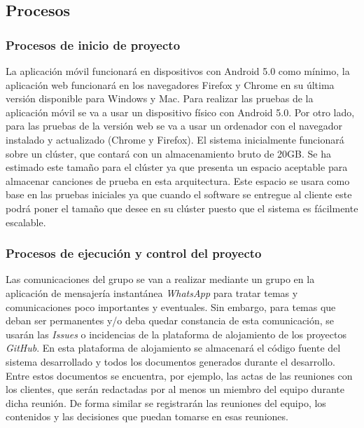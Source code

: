 \documentclass[12pt]{article}%
\begin{document}
\subsection{Procesos}

\subsubsection{Procesos de inicio de proyecto}

La aplicaci\'on m\'ovil funcionar\'a en dispositivos con Android 5.0 como m\'inimo, la aplicaci\'on web funcionar\'a en los navegadores Firefox y Chrome en su \'ultima versi\'on disponible para Windows y Mac. Para realizar las pruebas de la aplicaci\'on m\'ovil se va a usar un dispositivo f\'isico con Android 5.0. Por otro lado, para las pruebas de la versi\'on web se va a usar un ordenador con el navegador instalado y actualizado (Chrome y Firefox). El sistema inicialmente funcionar\'a sobre un cl\'uster, que contar\'a con un almacenamiento bruto de 20GB. Se ha estimado este tama\~no para el cl\'uster ya que presenta un espacio aceptable para almacenar canciones de prueba en esta arquitectura. Este espacio se usara como base en las pruebas iniciales ya que cuando el software se entregue al cliente este podr\'a poner el tama\~no que desee en su cl\'uster puesto que el sistema es f\'acilmente escalable. 


\subsubsection{Procesos de ejecuci\'on y control del proyecto}

Las comunicaciones del grupo se van a realizar mediante un grupo en la aplicaci\'on de mensajer\'ia instant\'anea \textit{WhatsApp} para tratar temas y comunicaciones poco importantes y eventuales. Sin embargo, para temas que deban ser permanentes y/o deba quedar constancia de esta comunicaci\'on, se usar\'an las \textit{Issues} o incidencias de la plataforma de alojamiento de los proyectos \textit{GitHub}. En esta plataforma de alojamiento se almacenar\'a el c\'odigo fuente del sistema desarrollado y todos los documentos generados durante el desarrollo. Entre estos documentos se encuentra, por ejemplo, las actas de las reuniones con los clientes, que ser\'an redactadas por al menos un miembro del equipo durante dicha reuni\'on. De forma similar se registrar\'an las reuniones del equipo, los contenidos y las decisiones que puedan tomarse en esas reuniones.\\
\end{document}
